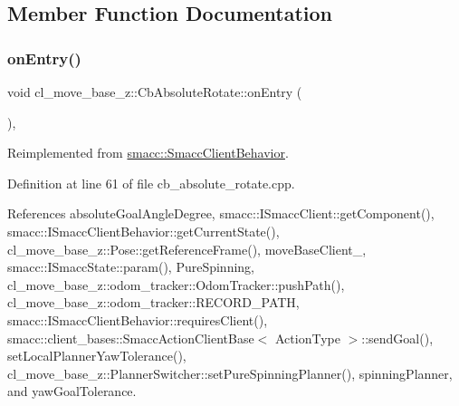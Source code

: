 \subsection{Member Function Documentation}
\mbox{\label{classcl__move__base__z_1_1CbAbsoluteRotate_a10418ea360809fa649d295716b152b2b}} 
\subsubsection{\texorpdfstring{on\+Entry()}{onEntry()}}
{\footnotesize\ttfamily void cl\+\_\+move\+\_\+base\+\_\+z\+::\+Cb\+Absolute\+Rotate\+::on\+Entry (\begin{DoxyParamCaption}{ }\end{DoxyParamCaption})\hspace{0.3cm}{\ttfamily [override]}, {\ttfamily [virtual]}}



Reimplemented from \hyperlink{classsmacc_1_1SmaccClientBehavior_ad5d3e1f1697c3cfe66c94cadba948493}{smacc\+::\+Smacc\+Client\+Behavior}.



Definition at line 61 of file cb\+\_\+absolute\+\_\+rotate.\+cpp.



References absolute\+Goal\+Angle\+Degree, smacc\+::\+I\+Smacc\+Client\+::get\+Component(), smacc\+::\+I\+Smacc\+Client\+Behavior\+::get\+Current\+State(), cl\+\_\+move\+\_\+base\+\_\+z\+::\+Pose\+::get\+Reference\+Frame(), move\+Base\+Client\+\_\+, smacc\+::\+I\+Smacc\+State\+::param(), Pure\+Spinning, cl\+\_\+move\+\_\+base\+\_\+z\+::odom\+\_\+tracker\+::\+Odom\+Tracker\+::push\+Path(), cl\+\_\+move\+\_\+base\+\_\+z\+::odom\+\_\+tracker\+::\+R\+E\+C\+O\+R\+D\+\_\+\+P\+A\+TH, smacc\+::\+I\+Smacc\+Client\+Behavior\+::requires\+Client(), smacc\+::client\+\_\+bases\+::\+Smacc\+Action\+Client\+Base$<$ Action\+Type $>$\+::send\+Goal(), set\+Local\+Planner\+Yaw\+Tolerance(), cl\+\_\+move\+\_\+base\+\_\+z\+::\+Planner\+Switcher\+::set\+Pure\+Spinning\+Planner(), spinning\+Planner, and yaw\+Goal\+Tolerance.


